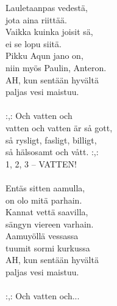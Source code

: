 
            Lauletaanpas vedestä, \\
            jota aina riittää. \\
            Vaikka kuinka joisit sä, \\
            ei se lopu siitä. \\
            Pikku Aqun jano on, \\
            niin myös Paulin, Anteron. \\
            AH, kun sentään hyvältä \\
            paljas vesi maistuu. \\
\hspace{10mm} \\
            :,: Och vatten och \\
            vatten och vatten är så gott, \\
            så rysligt, fasligt, billigt, \\
            så hälsosamt och vått. :,: \\
            1, 2, 3 – VATTEN! \\
\hspace{10mm} \\
            Entäs sitten aamulla, \\
            on olo mitä parhain. \\
            Kannat vettä saavilla, \\
            sängyn viereen varhain. \\
            Aamuyöllä vessassa \\
            tuumit sormi kurkussa \\
            AH, kun sentään hyvältä \\
            paljas vesi maistuu. \\
\hspace{10mm} \\
            :,: Och vatten och... \\
